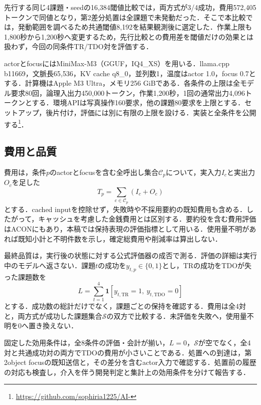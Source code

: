 \documentclass[letter]{ieicej}
\begin{document}
先行する同じ4課題・seedの16,384閾値比較では，両方式が3/4成功，費用572,405トークンで同値となり，第2差分処置は全課題で未発動だった．そこで本比較では，発動範囲を調べるため共通閾値8,192を結果観測後に選定した．作業上限も1,800秒から1,200秒へ変更するため，先行比較との費用差を閾値だけの効果とは扱わず，今回の同条件TR/TDO対を評価する．

actorとfocusにはMiniMax-M3（GGUF，IQ4\_XS）を用いる．llama.cpp b11669，文脈長65,536，KV cache q8\_0，並列数1，温度はactor 1.0，focus 0.7とする．計算機はApple M3 Ultra，メモリ256 GiBである．各条件の上限は全モデル要求80回，論理入出力450,000トークン，作業1,200秒，1回の通常出力4,096トークンとする．環境APIは写真操作160要求，他の課題80要求を上限とする．セットアップ，後片付け，評価には別に有限の上限を設ける．実装と全条件を公開する\footnote{\url{https://github.com/sophiria1225/AI-}}．

\subsection{費用と品質}
費用は，条件$p$のactorとfocusを含む全呼出し集合$\mathcal{C}_p$について，実入力$I_c$と実出力$O_c$を足した
\begin{equation}
 T_p=\sum_{c\in\mathcal{C}_p}(I_c+O_c)
 \label{eq:cost}
\end{equation}
とする．cached inputを控除せず，失敗時や不採用要約の既知費用も含める．したがって，キャッシュを考慮した金銭費用とは区別する\cite{xu2026tokenpilot}．要約役を含む費用評価はACON\cite{kang2026acon}にもあり，本稿では保持表現の評価指標として用いる．使用量不明があれば既知小計と不明件数を示し，確定総費用や削減率は算出しない．

最終品質は，実行後の状態に対する公式評価器の成否で測る．評価の詳細は実行中のモデルへ返さない．課題$t$の成功を$y_{t,p}\in\{0,1\}$とし，TRの成功をTDOが失った課題数を
\begin{equation}
 L=\sum_{t=1}^{4}\mathbf{1}[y_{t,\mathrm{TR}}=1,\ y_{t,\mathrm{TDO}}=0]
 \label{eq:loss}
\end{equation}
とする．成功数の総計だけでなく，課題ごとの保持を確認する．費用は全4対と，両方式が成功した課題集合$\mathcal{S}$の双方で比較する．未評価を失敗へ，使用量不明を0へ置き換えない．

固定した効用条件は，全8条件の評価・会計が揃い，$L=0$，$\mathcal{S}$が空でなく，全4対と共通成功対の両方でTDOの費用が小さいことである．処置への到達は，第2object focusの既知送信と，その差分を含むactor入力で確認する．処置前の履歴の対応も検査し，介入を伴う開発判定と集計上の効用条件を分けて報告する．
\end{document}
